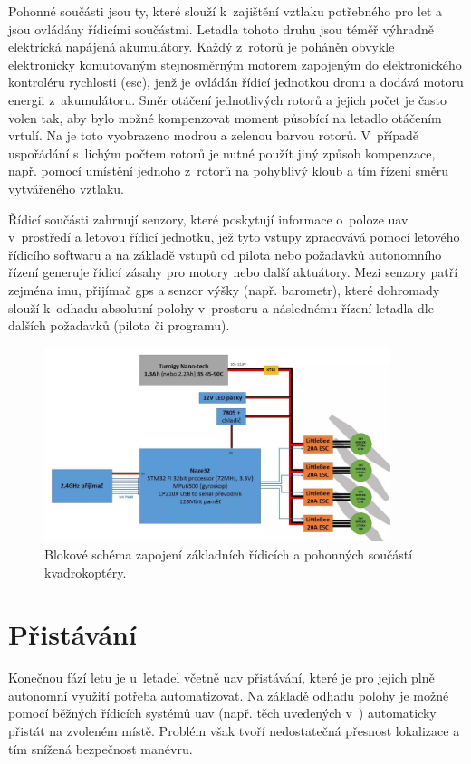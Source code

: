 Pohonné součásti jsou ty, které slouží k~zajištění vztlaku potřebného pro let a jsou ovládány řídicími součástmi. Letadla tohoto druhu jsou téměř výhradně elektrická napájená akumulátory. Každý z~rotorů je poháněn obvykle elektronicky komutovaným stejnosměrným motorem zapojeným do elektronického kontroléru rychlosti (\acrshort{esc}), jenž je ovládán řídicí jednotkou dronu a dodává motoru energii z~akumulátoru. Směr otáčení jednotlivých rotorů a jejich počet je často volen tak, aby bylo možné kompenzovat moment působící na letadlo otáčením vrtulí. Na  je toto vyobrazeno modrou a zelenou barvou rotorů. V~případě uspořádání s~lichým počtem rotorů je nutné použít jiný způsob kompenzace, např. pomocí umístění jednoho z~rotorů na pohyblivý kloub a tím řízení směru vytvářeného vztlaku.

Řídicí součásti zahrnují senzory, které poskytují informace o~poloze \acrshort{uav} v~prostředí a letovou řídicí jednotku, jež tyto vstupy zpracovává pomocí letového řídicího softwaru a na základě vstupů od pilota nebo požadavků autonomního řízení generuje řídicí zásahy pro motory nebo další aktuátory. Mezi senzory patří zejména \acrfull{imu}, přijímač \acrshort{gps} a senzor výšky (např. barometr), které dohromady slouží k~odhadu absolutní polohy v~prostoru a následnému řízení letadla dle dalších požadavků (pilota či programu).

\begin{figure}
    \centering
    \includegraphics[width=0.9\textwidth]{img/intro/schema-kvadrokoptera.png}
    \caption[Schéma zapojení součástí letadla]{Blokové schéma zapojení základních řídicích a pohonných součástí kvadrokoptéry. \cite{dronSoucasti}}
    \label{fig:dronSoucasti}
\end{figure}

\section{Přistávání}
Konečnou fází letu je u~letadel včetně \acrshort{uav} přistávání, které je pro jejich plně autonomní využití potřeba automatizovat. Na základě odhadu polohy je možné pomocí běžných řídicích systémů \acrshort{uav} (např. těch uvedených v~) automaticky přistát na zvoleném místě. Problém však tvoří nedostatečná přesnost lokalizace a tím snížená bezpečnost manévru.

